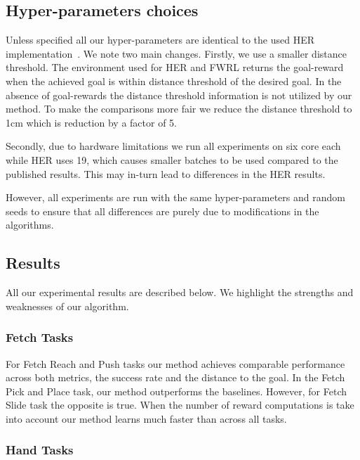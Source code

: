 %


\subsection{Hyper-parameters choices}
Unless specified all our hyper-parameters are identical to the used HER
implementation~\citep{dhariwal2017baselines}. We note two main changes. Firstly,
we use a smaller distance threshold.
The environment used for HER and FWRL returns the goal-reward when the
achieved goal is within distance threshold of the desired goal. In the absence
of goal-rewards the distance threshold information is not utilized by our
method.
To make the comparisons more fair we reduce the distance threshold to 1cm which
is reduction by a factor of 5.

Secondly, due to hardware limitations we run all experiments on six core each
while HER uses 19, which causes smaller batches to be used compared to the
published results. This may in-turn lead to differences in the HER results.

However, all experiments are run with the same hyper-parameters and random seeds
to ensure that all differences are purely due to modifications in the algorithms.

\subsection{Results}
All our experimental results are described below. We highlight the strengths and
weaknesses of our algorithm.

\subsubsection{Fetch Tasks}

For Fetch Reach and Push tasks our method achieves comparable performance
across both metrics, the success rate and the distance to the goal. In the Fetch
Pick and Place task, our method outperforms the baselines. However, for Fetch
Slide task the opposite is true.
When the number of reward computations is take into account our method learns
much faster than across all tasks.

\subsubsection{Hand Tasks}

